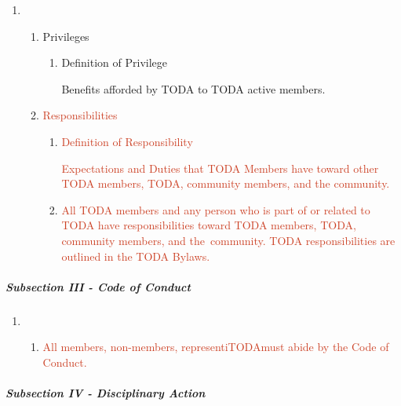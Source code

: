 \documentclass[12pt]{report}
\begin{document}
\begin{enumerate}[label*=\arabic*.]
	\item \begin{enumerate}[label*=\arabic*.]
	\item Privileges\par

\begin{enumerate}[label*={\fontsize{12pt}{12pt}\selectfont \arabic*.}]
	\item Definition of Privilege\par

\tab Benefits afforded by TODA to TODA active members.\par


\end{enumerate}
	\item \textcolor[HTML]{CC4125}{Responsibilities}\par

\begin{enumerate}[label*={\fontsize{12pt}{12pt}\selectfont \arabic*.}]
	\item \textcolor[HTML]{CC4125}{Definition of Responsibility}\par

\textcolor[HTML]{CC4125}{Expectations and Duties that TODA Members have toward other TODA members, TODA, community members, and the community.}\par

	\item \textcolor[HTML]{CC4125}{All TODA members and any person who is part of or related to TODA have responsibilities toward TODA members, TODA, community members, and the\ community.  TODA responsibilities are outlined in the TODA Bylaws.}\par


\end{enumerate}
\end{enumerate}
\end{enumerate}\subparagraph{Subsection III - Code of Conduct}
\begin{enumerate}[label*=\arabic*.]
	\item \begin{enumerate}[label*=\arabic*.]
	\item \textcolor[HTML]{CC4125}{All members, non-members, representiTODAmust abide by the Code of Conduct.}\par


\vspace{\baselineskip}

\end{enumerate}
\end{enumerate}\subparagraph{Subsection IV - Disciplinary Action}
\end{document}
